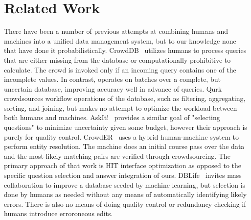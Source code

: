 \section{Related Work}
\label{sec:related}
There have been a number of previous attempts at combining humans and machines into a unified data management system, but to our knowledge none that have done it probabilistically.  CrowdDB~\cite{DBLP:conf/sigmod/FranklinKKRX11} utilizes humans to process queries that are either missing from the database or computationally prohibitive to calculate.  The crowd is invoked only if an incoming query contains one of the incomplete values.  In contrast, \sysName operates on batches over a complete, but uncertain database, improving accuracy well in advance of queries.  Qurk~\cite{DBLP:conf/sigmod/MarcusWKMM11} crowdsources workflow operations of the database, such as filtering, aggregating, sorting, and joining, but makes no attempt to optimize the workload between both humans and machines.  AskIt!~\cite{DBLP:conf/icde/BoimGMNPT12} provides a similar goal of "selecting questions" to minimize uncertainty given some budget, however their approach is purely for quality control.  CrowdER~\cite{DBLP:journals/pvldb/WangKFF12} uses a hybrid human-machine system to perform entity resolution.  The machine does an initial course pass over the data and the most likely matching pairs are verified through crowdsourcing.  The primary approach of that work is HIT interface optimization as opposed to the specific question selection and answer integration of ours.  DBLife~\cite{DBLP:conf/cidr/DeRoseSCLBDR07} invites mass collaboration to improve a database seeded by machine learning, but selection is done by humans as needed without any means of automatically identifying likely errors.  There is also no means of doing quality control or redundancy checking if humans introduce erroroneous edits.
